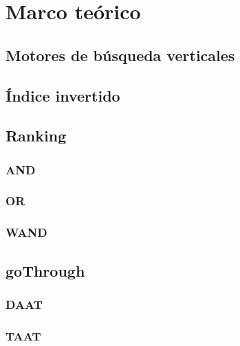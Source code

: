 \chapter*{Marco te\'orico}
\label{cap:marco}

\section{Motores de b\'usqueda verticales}
\label{marco:mbv}

\section{\'Indice invertido}
\label{marco:ii}

\section{Ranking}
\label{marco:r}

\subsection{AND}
\label{marco:and}

\subsection{OR}
\label{marco:or}

\subsection{WAND}
\label{marco:wand}

\section{goThrough}
\label{marco:goT}

\subsection{DAAT}
\label{marco:daat}


\subsection{TAAT}
\label{marco:taat}



